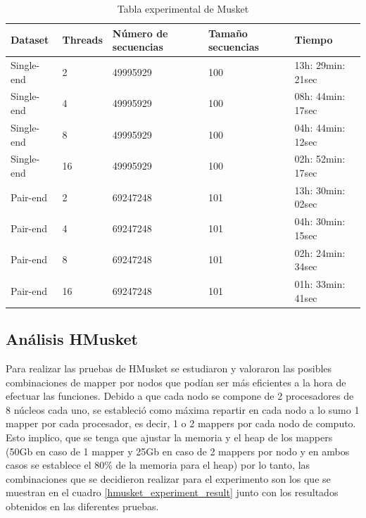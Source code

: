 \documentclass[conference]{IEEEtran}
\begin{document}
\begin{table}[t]
	\centering
	\caption{Tabla experimental de Musket}
	\label{musket_experiment_result}
	\begin{tabular}{|l|l|p{1.5cm}|p{1.3cm}|l|}
		\hline
		\textbf{Dataset} 	& \textbf{Threads} 	& \textbf{Número de secuencias} & \textbf{Tamaño secuencias} & \textbf{Tiempo}	\\ \hline
		Single-end 	& 2			& 49995929           & 100           & 13h: 29min: 21sec 	\\ \hline
		Single-end 	& 4			& 49995929           & 100           & 08h: 44min: 17sec	\\ \hline
		Single-end 	& 8			& 49995929           & 100           & 04h: 44min: 12sec 	\\ \hline
		Single-end 	& 16		& 49995929           & 100           & 02h: 52min: 17sec 	\\ \hline \hline
		Pair-end 	& 2			& 69247248           & 101           & 13h: 30min: 02sec 	\\ \hline
		Pair-end 	& 4			& 69247248           & 101           & 04h: 30min: 15sec	\\ \hline
		Pair-end 	& 8			& 69247248           & 101           & 02h: 24min: 34sec 	\\ \hline
		Pair-end 	& 16		& 69247248           & 101           & 01h: 33min: 41sec 	\\ \hline
	\end{tabular}
\end{table}

\subsection{Análisis HMusket}
Para realizar las pruebas de HMusket se estudiaron y valoraron las posibles combinaciones de mapper por nodos que podían ser más eficientes a la hora de efectuar las funciones. Debido a que cada nodo se compone de 2 procesadores de 8 núcleos cada uno, se estableció como máxima repartir en cada nodo a lo sumo 1 mapper por cada procesador, es decir, 1 o 2 mappers por cada nodo de computo. Esto implico, que se tenga que ajustar la memoria y el heap de los mappers (50Gb en caso de 1 mapper y 25Gb en caso de 2 mappers por nodo y en ambos casos se establece el 80\% de la memoria para el heap) por lo tanto, las combinaciones que se decidieron realizar para el experimento son los que se muestran en el cuadro \ref{hmusket_experiment_result} junto con los resultados obtenidos en las diferentes pruebas.\\
\end{document}
